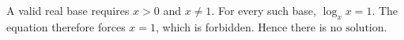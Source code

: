 A valid real base requires $ x>0 $ and $ x\ne1 $. For every such base, $\log_x x=1 $. The equation therefore forces $ x=1 $, which is forbidden. Hence there is $\boxed{\text{no solution}}$.
